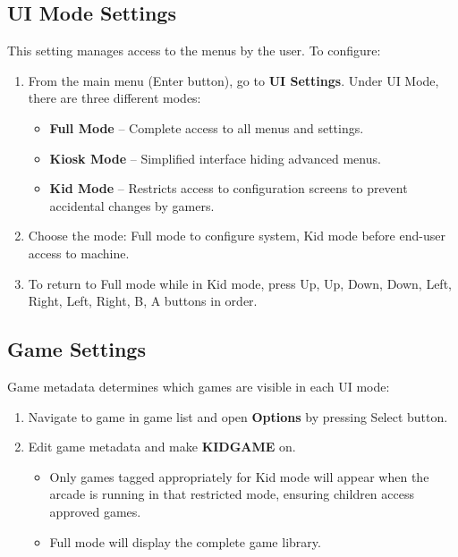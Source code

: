 \subsection{UI Mode Settings}
\label{subsec:ui_settings}

This setting manages access to the menus by the user. To configure:

\begin{enumerate}
  \item From the main menu (Enter button), go to \textbf{UI Settings}. Under UI Mode, there are three different modes:
    \begin{itemize}
      \item \textbf{Full Mode} – Complete access to all menus and settings.
      \item \textbf{Kiosk Mode} – Simplified interface hiding advanced menus.
      \item \textbf{Kid Mode} – Restricts access to configuration screens to prevent accidental changes by gamers.
    \end{itemize}

  \item Choose the mode: Full mode to configure system, Kid mode before end-user access to machine.
  \item To return to Full mode while in Kid mode, press Up, Up, Down, Down, Left, Right, Left, Right, B, A buttons in order.
\end{enumerate}

\subsection{Game Settings}
\label{subsec:game_settings}

Game metadata determines which games are visible in each UI mode:

\begin{enumerate}
  \item Navigate to game in game list and open \textbf{Options} by pressing Select button.
  \item Edit game metadata and make \textbf{KIDGAME} on.
    \begin{itemize}
      \item Only games tagged appropriately for Kid mode will appear when the arcade is   running in that restricted mode, ensuring children access approved games.
      \item Full mode will display the complete game library.
    \end{itemize}
\end{enumerate}
